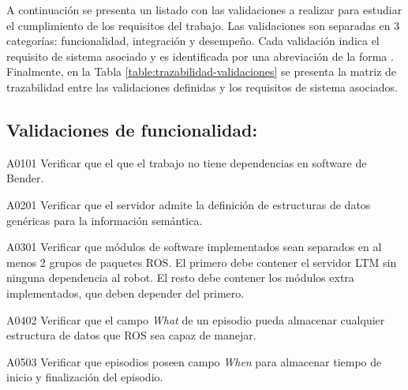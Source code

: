 A continuación se presenta un listado con las validaciones a realizar para estudiar el cumplimiento de los requisitos del trabajo. Las validaciones son separadas en 3 categorías: funcionalidad, integración y desempeño. Cada validación indica el requisito de sistema  asociado y es identificada por una abreviación de la forma . Finalmente, en la Tabla \ref{table:trazabilidad-validaciones} se presenta la matriz de trazabilidad entre las validaciones definidas y los requisitos de sistema asociados.

\newenvironment{def-validacion}[3]
{
	\noindent{\bfseries Validación \Vlabel{#1}{#2}}
	\hfill\textit{(Derivado de }\RSlabel{#3})\\
}{}

\subsection{Validaciones de funcionalidad: }

\begin{def-validacion}{A}{01}{01}
	Verificar que el que el trabajo no tiene dependencias en software de Bender.
\end{def-validacion}

\begin{def-validacion}{A}{02}{01}
	Verificar que el servidor admite la definición de estructuras de datos genéricas para la información semántica.	
\end{def-validacion}

\begin{def-validacion}{A}{03}{01}
	Verificar que módulos de software implementados sean separados en al menos 2 grupos de paquetes ROS. El primero debe contener el servidor LTM sin ninguna dependencia al robot. El resto debe contener los módulos extra implementados, que deben depender del primero.	
\end{def-validacion}

\begin{def-validacion}{A}{04}{02}
Verificar que el campo \textit{What} de un episodio pueda almacenar cualquier estructura de datos que ROS sea capaz de manejar.	
\end{def-validacion}

\begin{def-validacion}{A}{05}{03}
Verificar que episodios poseen campo \textit{When} para almacenar tiempo de inicio y finalización del episodio.	
\end{def-validacion}

